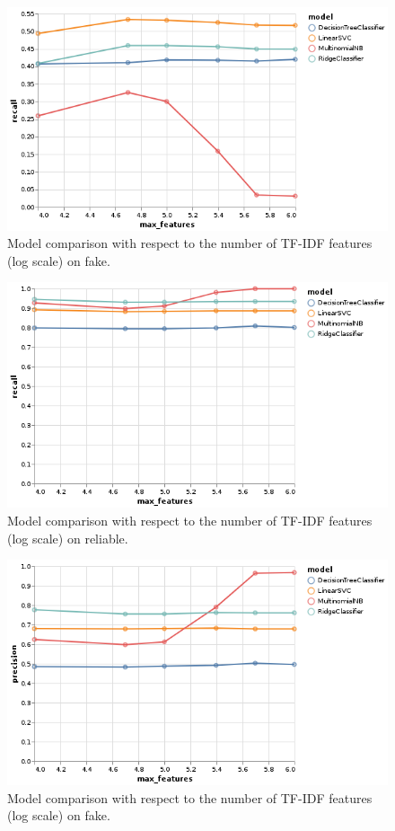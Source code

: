 \documentclass[11pt,a4paper,oneside]{report}
\begin{document}
\begin{figure}[h]
	\centering
	\includegraphics[width=\textwidth]{output/all_fake_recall.png}
	\caption{Model comparison with respect to the number of TF-IDF features (log scale) on fake.}
	\label{fig:all_recall_fake}
\end{figure}

\begin{figure}[h]
	\centering
	\includegraphics[width=\textwidth]{output/all_reliable_recall.png}
	\caption{Model comparison with respect to the number of TF-IDF features (log scale) on reliable.}
	\label{fig:all_recall_reliable}
\end{figure}

\begin{figure}[h]
	\centering
	\includegraphics[width=\textwidth]{output/all_fake_precision.png}
	\caption{Model comparison with respect to the number of TF-IDF features (log scale) on fake.}
	\label{fig:all_precision_fake}
\end{figure}
\end{document}
